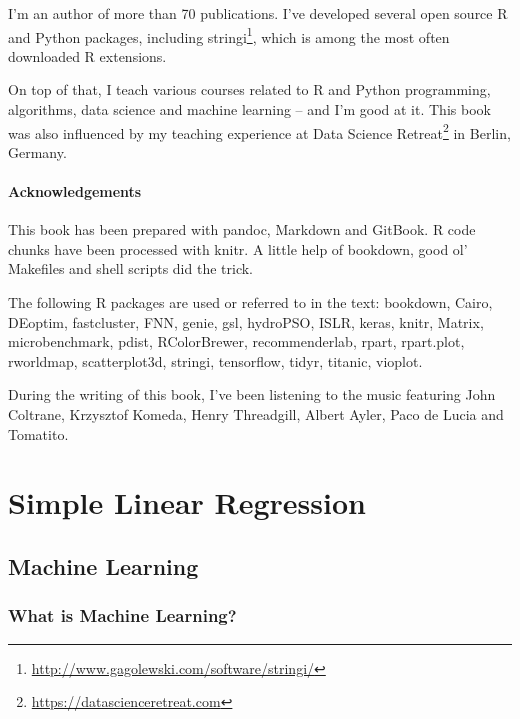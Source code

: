 \documentclass[10pt,b5paper,krantz1]{krantz}
\renewcommand{\href}[2]{#2\footnote{\url{#1}}}
\begin{document}
I'm an author of more than 70 publications.
I've developed several open source R and Python packages, including
\href{http://www.gagolewski.com/software/stringi/}{stringi},
which is among the most often downloaded R extensions.

On top of that, I teach various courses related to
R and Python programming, algorithms,
data science and machine learning -- and I'm good at it.
This book was also influenced by my teaching experience at
\href{https://datascienceretreat.com}{Data Science Retreat} in Berlin, Germany.

\hypertarget{acknowledgements}{%
\subsubsection*{Acknowledgements}\label{acknowledgements}}


This book has been prepared with pandoc, Markdown and GitBook.
R code chunks have been processed with knitr.
A little help of bookdown, good ol' Makefiles and shell scripts
did the trick.

The following R packages are used or referred to in the text:
bookdown, Cairo, DEoptim, fastcluster, FNN, genie, gsl, hydroPSO, ISLR, keras, knitr, Matrix, microbenchmark, pdist, RColorBrewer, recommenderlab, rpart, rpart.plot, rworldmap, scatterplot3d, stringi, tensorflow, tidyr, titanic, vioplot.

During the writing of this book, I've been listening to the music
featuring John Coltrane, Krzysztof Komeda,
Henry Threadgill, Albert Ayler, Paco de Lucia and Tomatito.

\mainmatter

\hypertarget{simple-linear-regression}{%
\chapter{Simple Linear Regression}\label{simple-linear-regression}}

\hypertarget{machine-learning}{%
\section{Machine Learning}\label{machine-learning}}

\hypertarget{what-is-machine-learning}{%
\subsection{What is Machine Learning?}\label{what-is-machine-learning}}
\end{document}
